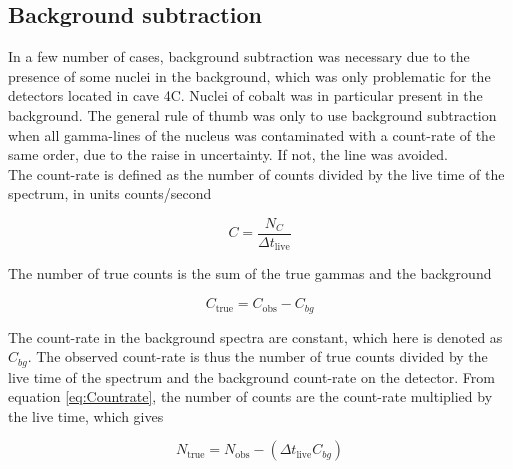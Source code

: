 \subsection{Background subtraction} \label{subsec:background_subtraction}
In a few number of cases, background subtraction was necessary due to the presence of some nuclei in the background, which was only problematic for the detectors located in cave 4C. Nuclei of cobalt was in particular present in the background. The general rule of thumb was only to use background subtraction when all gamma-lines of the nucleus was contaminated with a count-rate of the same order, due to the raise in uncertainty. If not, the line was avoided. \\

\noindent 
The count-rate is defined as the number of counts divided by the live time of the spectrum, in units counts/second 

\begin{equation} \label{eq:Countrate}
    C= \frac{N_C}{\Delta t_\text{live}}
\end{equation}

\noindent The number of true counts is the sum of the true gammas and the background 

\begin{equation}
    C_\text{true} = C_\text{obs} - C_{bg}
\end{equation}

\noindent The count-rate in the background spectra are constant, which here is denoted as $C_{bg}$. The observed count-rate is thus the number of true counts divided by the live time of the spectrum and the background count-rate on the detector. From equation \ref{eq:Countrate}, the number of counts are the count-rate multiplied by the live time, which gives

\begin{equation}
    N_\text{true} = N_\text{obs}-(\Delta t_\text{live}C_{bg})
\end{equation}


